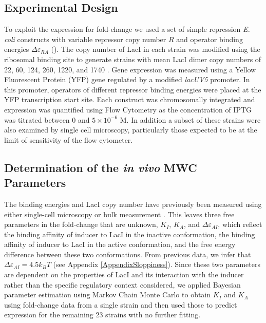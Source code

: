\pagebreak
\subsection*{Experimental Design}

To exploit the expression for fold-change \eref[eq7] we used a set of simple
repression \textit{E. coli} constructs with variable repressor copy number $R$ and
operator binding energies $\Delta\varepsilon_{RA}$ (\fref[figpolymeraseRepressorStates]).  The
copy number of LacI in each strain was modified using the ribosomal binding
site to generate strains with mean LacI dimer copy numbers of 22, 60, 124, 260,
1220, and 1740 \cite{Garcia2011}. Gene expression was measured using a Yellow
Fluorescent Protein (YFP) gene regulated by a modified \textit{lacUV5}
promoter. In this promoter, operators of different repressor binding energies
were placed at the YFP transcription start site. Each construct was
chromosomally integrated and expression was quantified using Flow Cytometry as
the concentration of IPTG was titrated between 0 and $5\times
10^{-6}\,\,\text{M}$. In addition a subset of these strains were also examined
by single cell microscopy, particularly those expected to be at the limit of
sensitivity of the flow cytometer.

\subsection*{Determination of the \textit{in vivo} MWC Parameters}

The binding energies and LacI copy number have
previously been measured using either single-cell microscopy or bulk
measurement \cite{Garcia2011, Brewster2014}. This leaves three free parameters
in the fold-change \eref[eq7] that are unknown, $K_I$, $K_A$, and $\Delta\varepsilon_{AI}$, which reflect the binding
affinity of inducer to LacI in the inactive conformation, the binding affinity of
inducer to LacI in the active conformation, and the free energy difference
between these two conformations. From previous data\cite{Brewster2014}, we infer that $\Delta\varepsilon_{AI} = 4.5k_BT$ (see Appendix \ref{AppendixSloppiness}). Since these
two parameters are dependent on the properties of LacI and its interaction with
the inducer rather than the specific regulatory context considered, we applied
Bayesian parameter estimation using Markov Chain Monte Carlo to obtain $K_I$ and
$K_A$ using fold-change data from a single strain and then used those to
predict expression for the remaining 23 strains with no further fitting.

